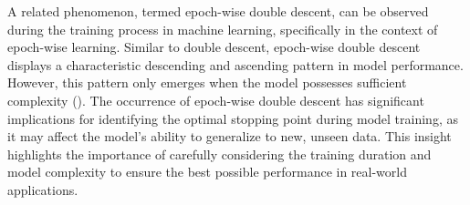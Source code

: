 A related phenomenon, termed epoch-wise double descent, can be observed during the training process in machine learning, specifically in the context of epoch-wise learning. Similar to double descent, epoch-wise double descent displays a characteristic descending and ascending pattern in model performance. However, this pattern only emerges when the model possesses sufficient complexity (\cite{Nakkiran2021DeepHurt, Stephenson2021WhenHappens}). The occurrence of epoch-wise double descent has significant implications for identifying the optimal stopping point during model training, as it may affect the model's ability to generalize to new, unseen data. This insight highlights the importance of carefully considering the training duration and model complexity to ensure the best possible performance in real-world applications.
